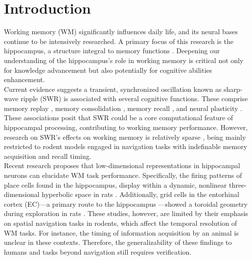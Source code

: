 \section{Introduction}
Working memory (WM) significantly influences daily life, and its neural bases continue to be intensively researched. A primary focus of this research is the hippocampus, a structure integral to memory functions \cite{scoville_loss_1957} \cite{squire_legacy_2009}  \cite{boran_persistent_2019} \cite{kaminski_persistently_2017} \cite{kornblith_persistent_2017} \cite{faraut_dataset_2018} \cite{borders_hippocampus_2022} \cite{li_functional_2023} \cite{dimakopoulos_information_2022}. Deepening our understanding of the hippocampus's role in working memory is critical not only for knowledge advancement but also potentially for cognitive abilities enhancement.
\\
\indent
Current evidence suggests a transient, synchronized oscillation known as sharp-wave ripple (SWR) \cite{buzsaki_hippocampal_2015} is associated with several cognitive functions. These comprise memory replay \cite{wilson_reactivation_1994} \cite{nadasdy_replay_1999} \cite{lee_memory_2002} \cite{diba_forward_2007} \cite{davidson_hippocampal_2009}, memory consolidation \cite{girardeau_selective_2009} \cite{ego-stengel_disruption_2010} \cite{fernandez-ruiz_long-duration_2019} \cite{kim_corticalhippocampal_2022}, memory recall \cite{wu_hippocampal_2017} \cite{norman_hippocampal_2019} \cite{norman_hippocampal_2021}, and neural plasticity \cite{behrens_induction_2005} \cite{norimoto_hippocampal_2018}. These associations posit that SWR could be a core computational feature of hippocampal processing, contributing to working memory performance. However, research on SWR's effects on working memory is relatively sparse \cite{jadhav_awake_2012}, being mainly restricted to rodent models engaged in navigation tasks with indefinable memory acquisition and recall timing.
\\
\indent
Recent research proposes that low-dimensional representations in hippocampal neurons can elucidate WM task performance. Specifically, the firing patterns of place cells \cite{okeefe_hippocampus_1971} \cite{okeefe_place_1976} \cite{ekstrom_cellular_2003} \cite{kjelstrup_finite_2008} \cite{harvey_intracellular_2009} found in the hippocampus, display within a dynamic, nonlinear three-dimensional hyperbolic space in rats \cite{zhang_hippocampal_2022}. Additionally, grid cells in the entorhinal cortex (EC)—a primary route to the hippocampus \cite{naber_reciprocal_2001} \cite{van_strien_anatomy_2009} \cite{strange_functional_2014}—showed a toroidal geometry during exploration in rats \cite{gardner_toroidal_2022}. These studies, however, are limited by their emphasis on spatial navigation tasks in rodents, which affect the temporal resolution of WM tasks. For instance, the timing of information acquisition by an animal is unclear in these contexts. Therefore, the generalizability of these findings to humans and tasks beyond navigation still requires verification.
